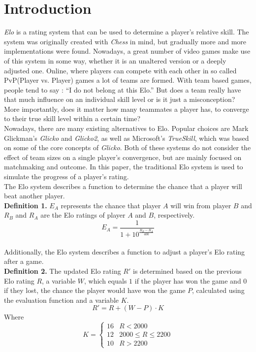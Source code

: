 \documentclass[12pt]{article}
\begin{document}
\section{Introduction}

\textit{Elo}\cite{elo} is a rating system that can be used to determine a player's relative skill. The system was originally created with \textit{Chess} in mind, but gradually more and more implementations were found. Nowadays, a great number of video games make use of this system in some way, whether it is an unaltered version or a deeply adjusted one. Online, where players can compete with each other in so called PvP(Player vs. Player) games a lot of teams are formed. With team based games, people tend to say :  ``I do not belong at this Elo.'' \cite{exampleclaim} But does a team really have that much influence on an individual skill level or is it just a misconception? More importantly, does it matter how many teammates a player has, to converge to their true skill level within a certain time?\\

Nowadays, there are many existing alternatives to Elo. Popular choices are Mark Glickman's \textit{Glicko} and \textit{Glicko2}\cite{glicko}, as well as Microsoft's \textit{TrueSkill}\texttrademark\cite{trueskill}, which was based on some of the core concepts of \textit{Glicko}. Both of these systems do not consider the effect of team sizes on a single player’s convergence, but are mainly focused on matchmaking and outcome. In this paper, the traditional Elo system is used to simulate the progress of a player's rating.\\

The Elo system describes a function to determine the chance that a player will beat another player.\\
\textbf{Definition 1.} $E_A$ represents the chance that player $A$ will win from player $B$ and $R_B$ and $R_A$ are the Elo ratings of player $A$ and $B$, respectively.\\
\[ E_A = \frac{1}{1 + 10^{\frac{R_{B}-R_{A}}{400}}} \]\\

Additionally, the Elo system describes a function to adjust a player’s Elo rating after a game.\\
\textbf{Definition 2.} The updated Elo rating $R'$ is determined based on the previous Elo rating $R$, a variable $W$, which equals $1$ if the player has won the game and $0$ if they lost, the chance the player would have won the game $P$, calculated using the evaluation function and a variable $K$.
\[R' = R + (W - P) \cdot K\]
Where
\[ K = \begin{cases}
16 & R < 2000 \\ 12 & 2000 \leq R \leq 2200 \\ 10 & R > 2200 
\end{cases}\]
\end{document}
